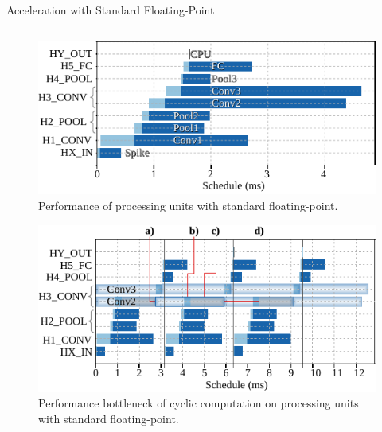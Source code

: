 \begin{frame}{Acceleration with Standard Floating-Point}
\begin{columns}
		\begin{column}{0.5\textwidth}
			\begin{minipage}[c][.45\textheight][c]{\linewidth}
				\centering
				\begin{figure}
				\includegraphics[width=0.75\linewidth]{../chapters/sbs_accelerator/figures/latency_pu_fp.pdf} %
				\caption{\scriptsize Performance of processing units with standard floating-point.}
				\end{figure}
				\pause
			\end{minipage}
			
			\begin{minipage}[c][.45\textheight][c]{\linewidth}
				\centering
				\begin{figure}
				\includegraphics[width=0.75\linewidth]{../chapters/sbs_accelerator/figures/latency_fp_cycle.pdf} %
				\caption{\scriptsize Performance bottleneck of cyclic computation on processing units with standard floating-point.}
				\end{figure}
			\end{minipage}
		\end{column}
	\end{columns}
\end{frame}

